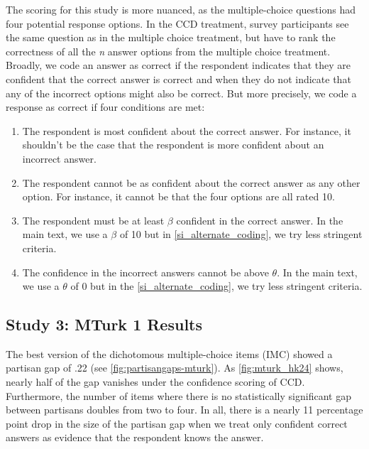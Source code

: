 \documentclass[12pt, letterpaper]{article}
\begin{document}
The scoring for this study is more nuanced, as the multiple-choice questions had four potential response options. In the CCD treatment, survey participants see the same question as in the multiple choice treatment, but have to rank the correctness of all the \emph{n} answer options from the multiple choice treatment. Broadly, we code an answer as correct if the respondent indicates that they are confident that the correct answer is correct and when they do not indicate that any of the incorrect options might also be correct. But more precisely, we code a response as correct if four conditions are met:

\begin{enumerate}

  \item The respondent is most confident about the correct answer. For instance, it shouldn't be the case that the respondent is more confident about an incorrect answer.

  \item The respondent cannot be as confident about the correct answer as any other option. For instance, it cannot be that the four options are all rated 10. 

  \item The respondent must be at least $\beta$ confident in the correct answer. In the main text, we use a $\beta$ of 10 but in \cref{si_alternate_coding}, we try less stringent criteria.

  \item The confidence in the incorrect answers cannot be above $\theta$. In the main text, we use a $\theta$ of 0 but in the \cref{si_alternate_coding}, we try less stringent criteria.

\end{enumerate}

\subsection*{Study 3: MTurk 1 Results}

The best version of the dichotomous multiple-choice items (IMC) showed a partisan gap of .22 (see \cref{fig:partisangaps-mturk}). As \cref{fig:mturk_hk24} shows, nearly half of the gap vanishes under the confidence scoring of CCD. Furthermore, the number of items where there is no statistically significant gap between partisans doubles from two to four. In all, there is a nearly 11 percentage point drop in the size of the partisan gap when we treat only confident correct answers as evidence that the respondent knows the answer. 
\end{document}
